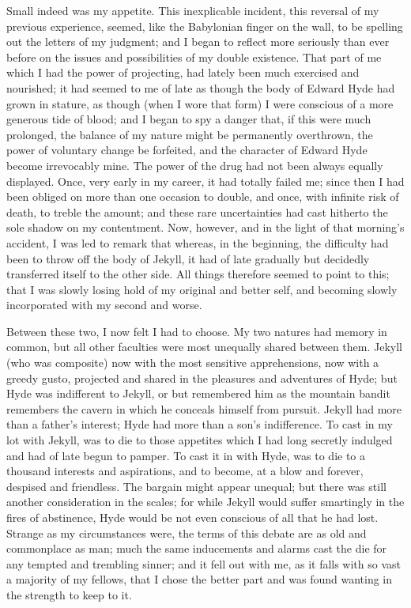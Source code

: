 \documentclass[12pt,openright]{book}
\begin{document}
Small indeed was my appetite. This inexplicable incident, this reversal of my previous experience, seemed, like the Babylonian finger on the wall, to be spelling out the letters of my judgment; and I began to reflect more seriously than ever before on the issues and possibilities of my double existence. That part of me which I had the power of projecting, had lately been much exercised and nourished; it had seemed to me of late as though the body of Edward Hyde had grown in stature, as though (when I wore that form) I were conscious of a more generous tide of blood; and I began to spy a danger that, if this were much prolonged, the balance of my nature might be permanently overthrown, the power of voluntary change be forfeited, and the character of Edward Hyde become irrevocably mine. The power of the drug had not been always equally displayed. Once, very early in my career, it had totally failed me; since then I had been obliged on more than one occasion to double, and once, with infinite risk of death, to treble the amount; and these rare uncertainties had cast hitherto the sole shadow on my contentment. Now, however, and in the light of that morning’s accident, I was led to remark that whereas, in the beginning, the difficulty had been to throw off the body of Jekyll, it had of late gradually but decidedly transferred itself to the other side. All things therefore seemed to point to this; that I was slowly losing hold of my original and better self, and becoming slowly incorporated with my second and worse.

Between these two, I now felt I had to choose. My two natures had memory in common, but all other faculties were most unequally shared between them. Jekyll (who was composite) now with the most sensitive apprehensions, now with a greedy gusto, projected and shared in the pleasures and adventures of Hyde; but Hyde was indifferent to Jekyll, or but remembered him as the mountain bandit remembers the cavern in which he conceals himself from pursuit. Jekyll had more than a father’s interest; Hyde had more than a son’s indifference. To cast in my lot with Jekyll, was to die to those appetites which I had long secretly indulged and had of late begun to pamper. To cast it in with Hyde, was to die to a thousand interests and aspirations, and to become, at a blow and forever, despised and friendless. The bargain might appear unequal; but there was still another consideration in the scales; for while Jekyll would suffer smartingly in the fires of abstinence, Hyde would be not even conscious of all that he had lost. Strange as my circumstances were, the terms of this debate are as old and commonplace as man; much the same inducements and alarms cast the die for any tempted and trembling sinner; and it fell out with me, as it falls with so vast a majority of my fellows, that I chose the better part and was found wanting in the strength to keep to it.
\end{document}
